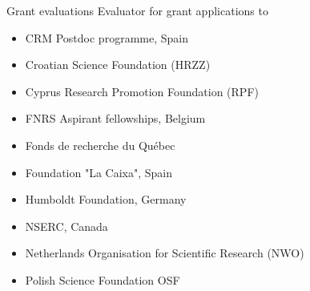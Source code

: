 \documentclass[12p]{resume}
\begin{document}
\begin{category}{Grant evaluations}
\citemnobullet Evaluator for 
grant applications to %
\begin{itemize}
\item CRM Postdoc programme, Spain %
\item  Croatian Science Foundation (HRZZ) %
\item  Cyprus Research Promotion Foundation (RPF) %
\item FNRS Aspirant fellowships, Belgium%
\item Fonds de recherche du Québec %
\item Foundation "La Caixa", Spain %
\item Humboldt Foundation, Germany %
\item NSERC, Canada %
\item Netherlands Organisation for Scientific Research (NWO) %
\item Polish Science Foundation OSF %
\end{itemize} 
 \end{category}
\end{document}
